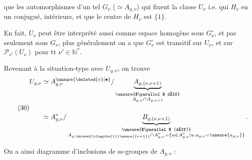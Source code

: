 que les automorphismes d'un tel $G_\nu$ ($\simeq A_{g,\nu}$) qui fixent la classe $U_\nu$ i.e. qui  $H_\nu$ en un conjugué,  intérieurs, et que le centre de $H_\nu$ est $\{1\}$.

En fait, $U_\nu$ peut être interprété aussi comme espace homogène sous $G_\nu^\circ$, et pas seulement sous $G_\nu$, plus généralement on a que $G_\nu^\circ$ est transitif sur $U_\nu$, et  sur $\mathcal P_{\nu'}(U_\nu)$ pour tt $\nu'\in\mathbb N^*$.

Revenant à la situation-type avec $U_{g,\nu}$, on trouve
\[
\tag{30}
\begin{aligned}
U_{g,\nu}
&\simeq A_{g,\nu}^{\unsure{\deleted{\circ}|\bullet}}/
\underbrace{A_{g,(\nu,\nu+1)}}_{\substack{\text{\unsure{$\parallel$ déf}}\\ A_{g,\nu}\cap A_{g,\nu+1}}}\\[1.2em]
&\simeq A_{g,\nu}^{\circ}/
\underbrace{B_{g,(\nu,\nu+1)}}_{\substack{\text{\unsure{$\parallel$ (déf)}}\\
 A_{g,\deleted{\illegible{1}}\unsure{\{\nu+1\}}}\cap A_{g,\nu}^{\circ}
 =\{u\in A_{g,\nu}^{\circ}\mid u.a_{g,\nu}=\unsure{a_{g,\nu}}\}}}.
\end{aligned}
\]

On a ainsi    diagramme d'inclusions de ss-groupes de $A_{g,\nu}$ :

